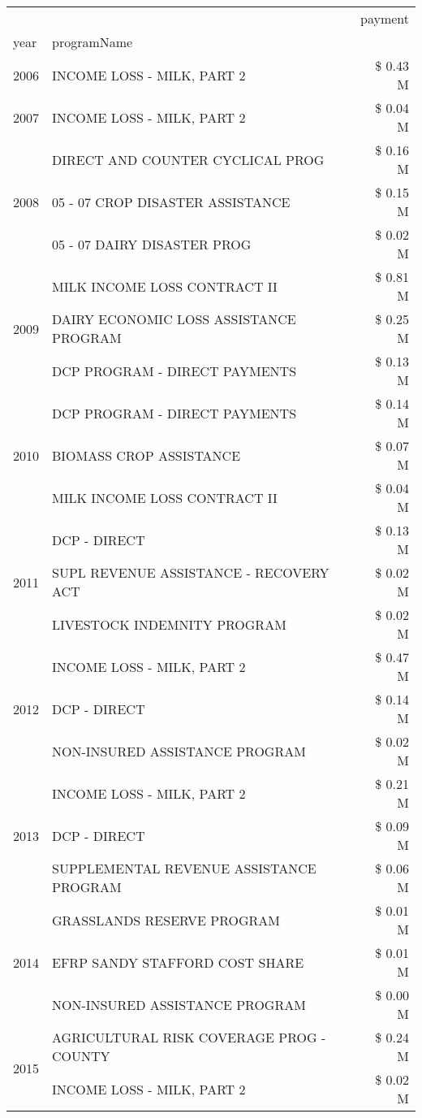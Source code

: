 \begin{tabular}{llr}
\toprule
 &  & payment \\
year & programName &  \\
\midrule
2006 & INCOME LOSS - MILK, PART 2 & \$ 0.43 M \\
\cline{1-3}
2007 & INCOME LOSS - MILK, PART 2 & \$ 0.04 M \\
\cline{1-3}
\multirow[t]{3}{*}{2008} & DIRECT AND COUNTER CYCLICAL PROG & \$ 0.16 M \\
 & 05 - 07 CROP DISASTER ASSISTANCE & \$ 0.15 M \\
 & 05 - 07 DAIRY DISASTER PROG & \$ 0.02 M \\
\cline{1-3}
\multirow[t]{3}{*}{2009} & MILK INCOME LOSS CONTRACT II & \$ 0.81 M \\
 & DAIRY ECONOMIC LOSS ASSISTANCE PROGRAM & \$ 0.25 M \\
 & DCP PROGRAM - DIRECT PAYMENTS & \$ 0.13 M \\
\cline{1-3}
\multirow[t]{3}{*}{2010} & DCP PROGRAM - DIRECT PAYMENTS & \$ 0.14 M \\
 & BIOMASS CROP ASSISTANCE & \$ 0.07 M \\
 & MILK INCOME LOSS CONTRACT II & \$ 0.04 M \\
\cline{1-3}
\multirow[t]{3}{*}{2011} & DCP - DIRECT & \$ 0.13 M \\
 & SUPL REVENUE ASSISTANCE - RECOVERY ACT & \$ 0.02 M \\
 & LIVESTOCK INDEMNITY PROGRAM & \$ 0.02 M \\
\cline{1-3}
\multirow[t]{3}{*}{2012} & INCOME LOSS - MILK, PART 2 & \$ 0.47 M \\
 & DCP - DIRECT & \$ 0.14 M \\
 & NON-INSURED ASSISTANCE PROGRAM & \$ 0.02 M \\
\cline{1-3}
\multirow[t]{3}{*}{2013} & INCOME LOSS - MILK, PART 2 & \$ 0.21 M \\
 & DCP - DIRECT & \$ 0.09 M \\
 & SUPPLEMENTAL REVENUE ASSISTANCE PROGRAM & \$ 0.06 M \\
\cline{1-3}
\multirow[t]{3}{*}{2014} & GRASSLANDS RESERVE PROGRAM & \$ 0.01 M \\
 & EFRP SANDY STAFFORD COST SHARE & \$ 0.01 M \\
 & NON-INSURED ASSISTANCE PROGRAM & \$ 0.00 M \\
\cline{1-3}
\multirow[t]{3}{*}{2015} & AGRICULTURAL RISK COVERAGE PROG - COUNTY & \$ 0.24 M \\
 & INCOME LOSS - MILK, PART 2 & \$ 0.02 M \\

\end{tabular}
